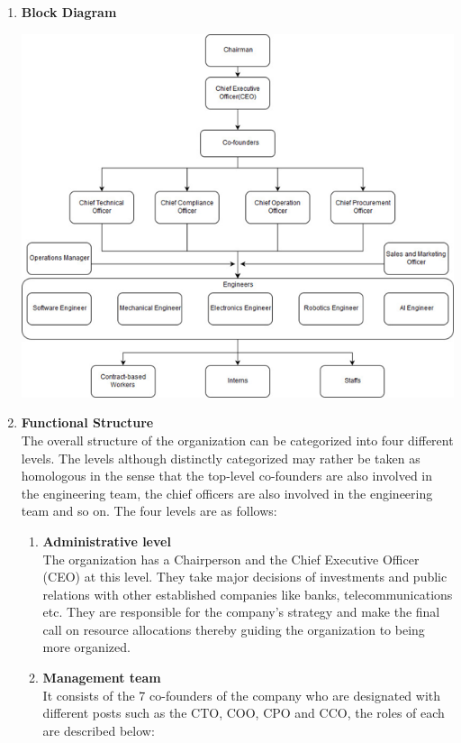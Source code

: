 \documentclass[12pt,a4paper]{scrreprt}
\begin{document}
\begin{enumerate}
    \item \textbf{Block Diagram} \\
    \begin{center}
        \includegraphics[scale=0.7]{block-diagram.png}
    \end{center}

    \item \textbf{Functional Structure} \\
    The overall structure of the organization can be categorized into four different levels. The levels although distinctly categorized may rather be taken as homologous in the sense that the top-level co-founders are also involved in the engineering team, the chief officers are also involved in the engineering team and so on. The four levels are as follows:

        \begin{enumerate}
            \item \textbf{Administrative level} \\
            The organization has a Chairperson and the Chief Executive Officer (CEO) at this level. They take major decisions of investments and public relations with other established companies like banks, telecommunications etc. They are responsible for the company's strategy and make the final call on resource allocations thereby guiding the organization to being more organized.

            \item \textbf{Management team} \\
            It consists of the 7 co-founders of the company who are designated with different posts such as the CTO, COO, CPO and CCO, the roles of each are described below:


\end{enumerate}
\end{enumerate}
\end{document}
